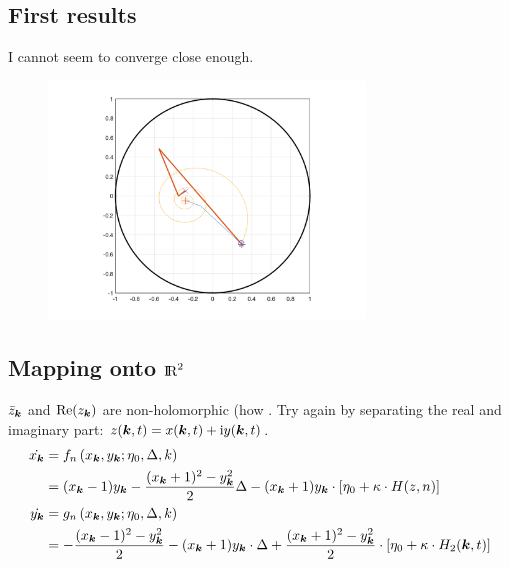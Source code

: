 \subsection{First results}
I cannot seem to converge close enough.
\begin{figure}[H]
\centering
\includegraphics[width = 0.75\textwidth]{../Figures/ProblemsWithNewtonRaphson.png}
\end{figure}


\subsection{Mapping onto ${\rm I\!R}^2$}
$\bar{z}_{{\boldsymbol{k}}}$ and ${\operatorname{Re}}(z_{{\boldsymbol{k}}})$ are non-holomorphic (how . Try again by separating the real and imaginary part: $z({\boldsymbol{k}},t) = x({\boldsymbol{k}},t) + {\rm{i}} y({\boldsymbol{k}},t)$.
\begin{align*}
\begin{aligned} \dot{x_{{\boldsymbol{k}}}} 
&=f_{n}\left(x_{{\boldsymbol{k}}}, y_{{\boldsymbol{k}}} ; \eta_{0}, \Delta, k\right) \\ 
&=(x_{{\boldsymbol{k}}}-1) y_{{\boldsymbol{k}}}-\frac{(x_{{\boldsymbol{k}}}+1)^{2}-y_{{\boldsymbol{k}}}^{2}}{2} \Delta-(x_{{\boldsymbol{k}}}+1) y_{{\boldsymbol{k}}} \cdot \left[\eta_{0}+ \kappa \cdot H(z, n)\right] \\ \dot{y_{{\boldsymbol{k}}}} &=g_{n}\left(x_{{\boldsymbol{k}}}, y_{{\boldsymbol{k}}} ; \eta_{0}, \Delta, k\right) \\ 
&=-\frac{(x_{{\boldsymbol{k}}}-1)^{2}-y_{{\boldsymbol{k}}}^{2}}{2}-(x_{{\boldsymbol{k}}}+1) y_{{\boldsymbol{k}}} \cdot \Delta+\frac{(x_{{\boldsymbol{k}}}+1)^{2}-y_{{\boldsymbol{k}}}^{2}}{2} \cdot \left[\eta_{0} + \kappa \cdot H_2({\boldsymbol{k}}, t)\right] \end{aligned}
\end{align*}

